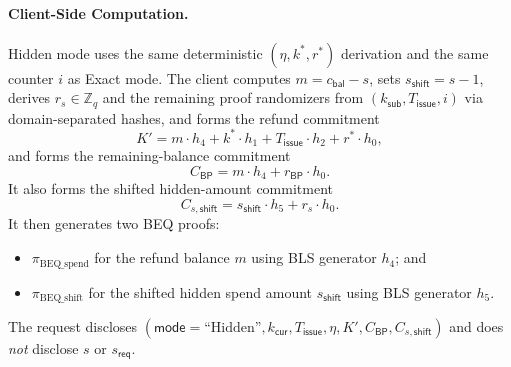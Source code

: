 \documentclass[11pt]{article}
\theoremstyle{definitionstyle}
\theoremstyle{plain}
\begin{document}
\paragraph{Client-Side Computation.}
Hidden mode uses the same deterministic $(\eta, k^*, r^*)$ derivation and the same counter $i$ as Exact mode. The client computes $m = c_{\mathsf{bal}} - s$, sets $s_{\mathsf{shift}} = s-1$, derives $r_s \in \mathbb{Z}_q$ and the remaining proof randomizers from $(k_{\mathsf{sub}}, T_{\mathsf{issue}}, i)$ via domain-separated hashes, and forms the refund commitment
\[
K' = m \cdot h_4 + k^* \cdot h_1 + T_{\mathsf{issue}} \cdot h_2 + r^* \cdot h_0,
\]
and forms the remaining-balance commitment
\[
C_{\mathsf{BP}} = m \cdot h_4 + r_{\mathsf{BP}} \cdot h_0.
\]
It also forms the shifted hidden-amount commitment
\[
C_{s,\mathsf{shift}} = s_{\mathsf{shift}} \cdot h_5 + r_s \cdot h_0.
\]
It then generates two BEQ proofs:
\begin{itemize}[leftmargin=*]
\item $\pi_{\text{BEQ\_spend}}$ for the refund balance $m$ using BLS generator $h_4$; and
\item $\pi_{\text{BEQ\_shift}}$ for the shifted hidden spend amount $s_{\mathsf{shift}}$ using BLS generator $h_5$.
\end{itemize}
The request discloses $(\mathsf{mode}=\text{``Hidden''}, k_{\mathsf{cur}}, T_{\mathsf{issue}}, \eta, K', C_{\mathsf{BP}}, C_{s,\mathsf{shift}})$ and does \emph{not} disclose $s$ or $s_{\mathsf{req}}$.
\end{document}
